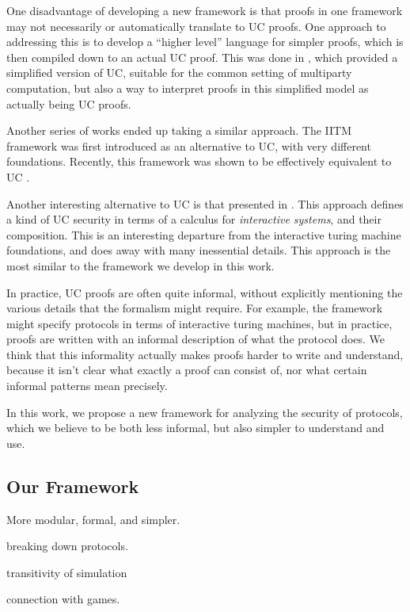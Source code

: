 One disadvantage of developing a new framework is that
proofs in one framework may not necessarily
or automatically translate to UC proofs.
One approach to addressing this is to develop
a ``higher level'' language for simpler proofs,
which is then compiled down to an actual UC proof.
This was done in \cite{C:CanCohLin15},
which provided a simplified version of UC, suitable
for the common setting of multiparty computation,
but also a way to interpret proofs in this simplified
model as actually being UC proofs.

Another series of works ended up taking
a similar approach.
The IITM framework \cite{EPRINT:Kuesters06, JC:KusTueRau20a}
was first introduced as an alternative to UC, with very different foundations.
Recently, this framework was shown to be effectively equivalent to UC
\cite{EC:RauKusChe22}.

Another interesting alternative to UC is that presented in
\cite{cramer2015secure}.
This approach defines a kind of UC security in terms of
a calculus for \emph{interactive systems},
and their composition.
This is an interesting departure from the interactive turing machine
foundations, and does away with many inessential details.
This approach is the most similar to the framework we develop
in this work.

In practice, UC proofs are often quite informal,
without explicitly mentioning the various details that the formalism
might require.
For example, the framework might specify protocols
in terms of interactive turing machines, but in practice,
proofs are written with an informal description of what the protocol
does.
We think that this informality actually
makes proofs harder to write and understand,
because it isn't clear what exactly a proof can consist of,
nor what certain informal patterns mean precisely.

In this work, we propose a new framework for analyzing the security
of protocols, which we believe to be both less informal,
but also simpler to understand and use.

\subsection{Our Framework}

More modular, formal, and simpler.

breaking down protocols.

transitivity of simulation

connection with games.

